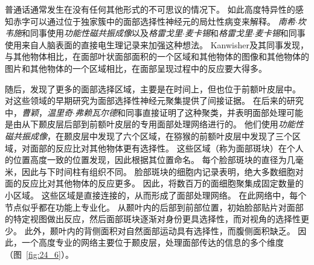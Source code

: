 普通话通常发生在没有任何其他形式的不可思议的情况下。
如此高度特异性的感知赤字可以通过位于独家簇中的面部选择性神经元的局灶性病变来解释。
\textit{南希$\cdot$坎韦施}和同事使用\textit{功能性磁共振成像}以及\textit{格雷戈里$\cdot$麦卡锡}和\textit{格雷戈里$\cdot$麦卡锡}和同事使用来自人脑表面的直接电生理记录来加强这种想法。
Kanwisher及其同事发现，与其他物体相比，在面部叶状面部面积的一个区域和其他物体的图像和其他物体的图片和其他物体的一个区域相比，在面部呈现过程中的反应要大得多。


随后，发现了更多的面部选择区域，主要是在时间上，但也位于前额叶皮层中。
对这些领域的早期研究为面部选择性神经元聚集提供了间接证据。
在后来的研究中，\textit{曹颖}，\textit{温里奇$\cdot$弗赖瓦尔德}和同事直接证明了这种聚类，并表明面部处理可能是由从下颞皮层后部到前额叶皮层的专用面部处理网络进行的。
他们使用\textit{功能性磁共振成像}，在颞皮层中发现了六个区域，在猕猴的前额叶皮层中发现了三个区域，对面部的反应比对其他物体更有选择性。
这些区域（称为面部斑块）在个人的位置高度一致的位置发现，因此根据其位置命名。
每个脸部斑块的直径为几毫米，因此与下时间柱有组织不同。
脸部斑块的细胞内记录表明，绝大多数细胞对面的反应比对其他物体的反应更多。
因此，将数百万的面细胞聚集成固定数量的小区域。
这些区域是直接连接的，从而形成了面部处理网络。
在此网络中，每个节点似乎都在功能上专业化。
从颞叶内的后部到前部位置，初始脸部贴片对面部的特定视图做出反应，然后面部斑块逐渐对身份更具选择性，而对视角的选择性更少。 
此外，颞叶内的背侧面积对自然面部运动具有选择性，而腹侧面积缺乏。
因此，一个高度专业的网络主要位于颞皮层，处理面部传达的信息的多个维度（图~\ref{fig:24_6}）。


